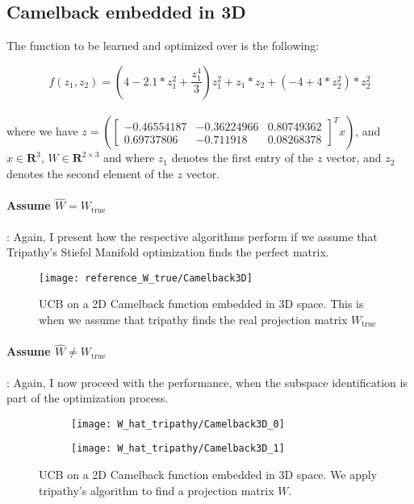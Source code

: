 \subsection{Camelback embedded in 3D}

The function to be learned and optimized over is the following:

\def\WCamelback3D{
\begin{bmatrix}
    -0.46554187 & -0.36224966 & 0.80749362 \\
     0.69737806 & -0.711918 & 0.08268378
\end{bmatrix}}

\begin{equation}
f(z_1, z_2) = \left( 4 - 2.1 * z_1^2 + \frac{z_1^4}{3} \right)  z_1^2 + z_1 *  z_2 + \left(-4 + 4 * z_2^2 \right) * z_2^2
\end{equation} \\

where we have $z = \left( \WCamelback3D^T x \right) $, and $ x \in \mathbf{R}^3$, $W \in \mathbf{R}^{2 \times 3}$ and where $z_1$ denotes the first entry of the $z$ vector, and $z_2$ denotes the second element of the $z$ vector.

\paragraph{Assume $\hat{W} = W_{\text{true}}$}: Again, I present how the respective algorithms perform if we assume that Tripathy's Stiefel Manifold optimization finds the perfect matrix.

\begin{figure}[H]
  \centering
      \texttt{[image: reference\_W\_true/Camelback3D]}
  \caption{UCB on a 2D Camelback function embedded in 3D space.
  This is when we assume that tripathy finds the real projection matrix $W_{\text{true}}$}
\end{figure}

\paragraph{Assume $\hat{W} \neq W_{\text{true}}$}: Again, I now proceed with the performance, when the subspace identification is part of the optimization process.

\begin{figure}[H]
    \centering
    \begin{subfigure}[b]{0.40\textwidth}
        \texttt{[image: W\_hat\_tripathy/Camelback3D\_0]}
        \label{fig:gull}
    \end{subfigure}
    \begin{subfigure}[b]{0.40\textwidth}
        \texttt{[image: W\_hat\_tripathy/Camelback3D\_1]}
        \label{fig:tiger}
    \end{subfigure}   
        \caption{UCB on a 2D Camelback function embedded in 3D space.
  		We apply tripathy's algorithm to find a projection matrix $W$.}
\end{figure}

